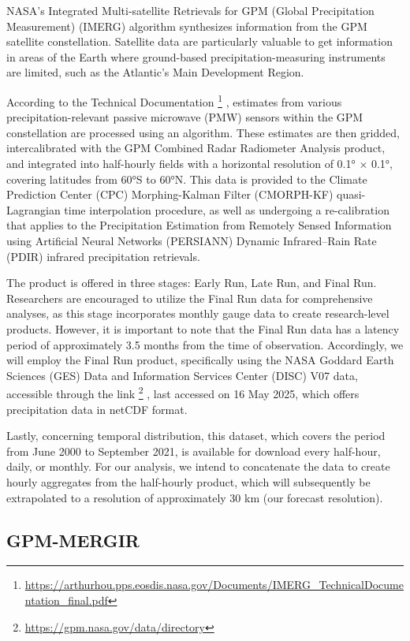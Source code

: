 NASA’s Integrated Multi-satellite Retrievals for GPM (Global Precipitation Measurement) (IMERG) \cite{huffman2019gpm} algorithm synthesizes information from the GPM satellite constellation. Satellite data are particularly valuable to get information in areas of the Earth where ground-based precipitation-measuring instruments are limited, such as the Atlantic’s Main Development Region.

According to the Technical Documentation \footnote{\url{https://arthurhou.pps.eosdis.nasa.gov/Documents/IMERG_TechnicalDocumentation_final.pdf}}
, estimates from various precipitation-relevant passive microwave (PMW) sensors within the GPM constellation are processed using an algorithm. These estimates are then gridded, intercalibrated with the GPM Combined Radar Radiometer Analysis product, and integrated into half-hourly fields with a horizontal resolution of 0.1° × 0.1°, covering latitudes from 60°S to 60°N. This data is provided to the Climate Prediction Center (CPC) Morphing-Kalman Filter (CMORPH-KF) quasi-Lagrangian time interpolation procedure, as well as undergoing a re-calibration that applies to the Precipitation Estimation from Remotely Sensed Information using Artificial Neural Networks (PERSIANN) Dynamic Infrared–Rain Rate (PDIR) infrared precipitation retrievals.

The product is offered in three stages: Early Run, Late Run, and Final Run. Researchers are encouraged to utilize the Final Run data for comprehensive analyses, as this stage incorporates monthly gauge data to create research-level products. However, it is important to note that the Final Run data has a latency period of approximately 3.5 months from the time of observation. Accordingly, we will employ the Final Run product, specifically using the NASA Goddard Earth Sciences (GES) Data and Information Services Center (DISC) V07 data, accessible through the link 
\footnote{\url{https://gpm.nasa.gov/data/directory}}
, last accessed on 16 May 2025, which offers precipitation data in netCDF format.

Lastly, concerning temporal distribution, this dataset, which covers the period from June 2000 to September 2021, is available for download every half-hour, daily, or monthly. For our analysis, we intend to concatenate the data to create hourly aggregates from the half-hourly product, which will subsequently be extrapolated to a resolution of approximately 30 km (our forecast resolution).


\subsection{GPM-MERGIR}

